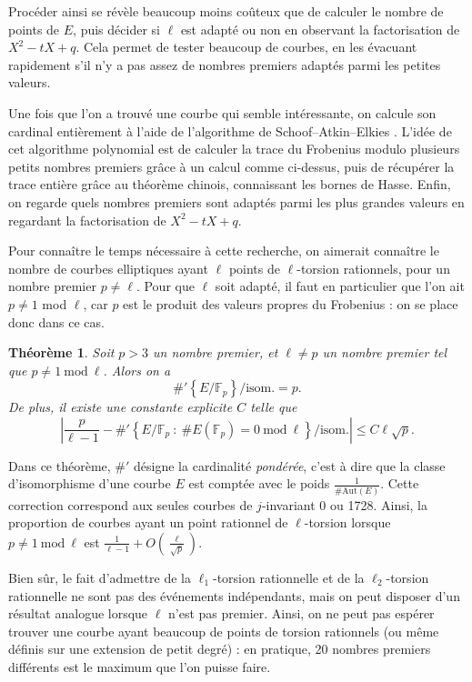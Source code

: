 \documentclass[11pt,a4paper]{article}
\newcommand{\F}{\mathbb{F}}
\renewcommand{\mod}{\ \mathrm{mod}\ }
\newtheorem*{thm}{Théorème}
\theoremstyle{definition}
\begin{document}
Procéder ainsi se révèle beaucoup moins coûteux que de calculer le nombre de points de $E$, puis décider si $\ell$ est adapté ou non en observant la factorisation de $X^2 - tX + q$. Cela permet de tester beaucoup de courbes, en les évacuant rapidement s'il n'y a pas assez de nombres premiers adaptés parmi les petites valeurs.

Une fois que l'on a trouvé une courbe qui semble intéressante, on calcule son cardinal entièrement à l'aide de l'algorithme de Schoof--Atkin--Elkies \cite{Schoof}. L'idée de cet algorithme polynomial est de calculer la trace du Frobenius modulo plusieurs petits nombres premiers grâce à un calcul comme ci-dessus, puis de récupérer la trace entière grâce au théorème chinois, connaissant les bornes de Hasse. Enfin, on regarde quels nombres premiers sont adaptés parmi les plus grandes valeurs en regardant la factorisation de $X^2 - tX + q$.

Pour connaître le temps nécessaire à cette recherche, on aimerait connaître le nombre de courbes elliptiques ayant $\ell$ points de $\ell$-torsion rationnels, pour un nombre premier $p\neq \ell$. Pour que $\ell$ soit adapté, il faut en particulier que l'on ait $p\neq 1$ mod $\ell$, car $p$ est le produit des valeurs propres du Frobenius : on se place donc dans ce cas.

\begin{thm}
Soit $p>3$ un nombre premier, et $\ell\neq p$ un nombre premier tel que $p\neq 1 \mod\ell$. Alors on a
$$ \#'\left\{E/\F_p \right\}/\mathrm{isom.} = p.$$
De plus, il existe une constante explicite $C$ telle que
$$ \left| \frac{p}{\ell - 1}  - \#' \left\{E/\F_p\ :\ \#E(\F_p) = 0 \mod\ell\right\}/\mathrm{isom.} \right|\leq C\ell\sqrt{p}.$$
\end{thm}

Dans ce théorème, $\#'$ désigne la cardinalité \emph{pondérée}, c'est à dire que la classe d'isomorphisme d'une courbe $E$ est comptée avec le poids $\frac{1}{\#\mathrm{Aut}(E)}$. Cette correction correspond aux seules courbes de $j$-invariant 0 ou 1728. Ainsi, la proportion de courbes ayant un point rationnel de $\ell$-torsion lorsque $p\neq 1 \mod \ell$ est $\frac{1}{\ell - 1} + O(\frac{\ell}{\sqrt{p}}).$

Bien sûr, le fait d'admettre de la $\ell_1$-torsion rationnelle et de la $\ell_2$-torsion rationnelle ne sont pas des événements indépendants, mais on peut disposer d'un résultat analogue lorsque $\ell$ n'est pas premier. Ainsi, on ne peut pas espérer trouver une courbe ayant beaucoup de points de torsion rationnels (ou même définis sur une extension de petit degré) : en pratique, 20 nombres premiers différents est le maximum que l'on puisse faire.
\end{document}
